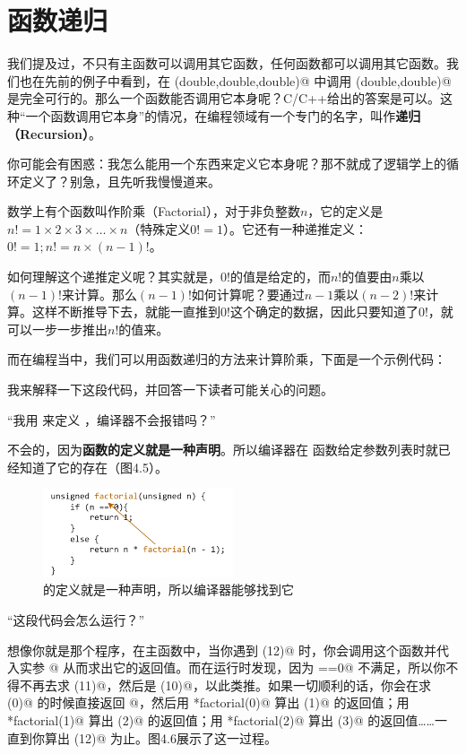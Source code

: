 \section{函数递归}
我们提及过，不只有主函数可以调用其它函数，任何函数都可以调用其它函数。我们也在先前的例子中看到，在 \lstinline@max(double,double,double)@ 中调用 \lstinline@max(double,double)@ 是完全可行的。那么一个函数能否调用它本身呢？C/C++给出的答案是可以。这种``一个函数调用它本身''的情况，在编程领域有一个专门的名字，叫作\textbf{递归（Recursion）}。\par
你可能会有困惑：我怎么能用一个东西来定义它本身呢？那不就成了逻辑学上的循环定义了？别急，且先听我慢慢道来。\par
数学上有个函数叫作阶乘（Factorial），对于非负整数$n$，它的定义是$n!=1\times2\times3\times\ldots\times n$（特殊定义$0!=1$）。它还有一种递推定义：$0!=1; n!=n\times(n-1)!$。\par
如何理解这个递推定义呢？其实就是，$0!$的值是给定的，而$n!$的值要由$n$乘以$(n-1)!$来计算。那么$(n-1)!$如何计算呢？要通过$n-1$乘以$(n-2)!$来计算。这样不断推导下去，就能一直推到$0!$这个确定的数据，因此只要知道了$0!$，就可以一步一步推出$n!$的值来。\par
而在编程当中，我们可以用函数递归的方法来计算阶乘，下面是一个示例代码：

我来解释一下这段代码，并回答一下读者可能关心的问题。\par
{\kaishu ``我用 \lstinline@factorial@ 来定义 \lstinline@factorial@，编译器不会报错吗？''}\par
不会的，因为\textbf{函数的定义就是一种声明}。所以编译器在 \lstinline@factorial@ 函数给定参数列表时就已经知道了它的存在（图4.5）。\par
\begin{figure}[htbp]
    \centering
    \includegraphics[width=0.5\textwidth]{../images/generalized_parts/04_factorial_code_logic.drawio.png}
    \caption{\lstinline@factorial@ 的定义就是一种声明，所以编译器能够找到它}
\end{figure}
{\kaishu ``这段代码会怎么运行？''}\par
想像你就是那个程序，在主函数中，当你遇到 \lstinline@factorial(12)@ 时，你会调用这个函数并代入实参 @ 从而求出它的返回值。而在运行时发现，因为 \lstinline@n==0@ 不满足，所以你不得不再去求 \lstinline@factorial(11)@，然后是 \lstinline@factorial(10)@，以此类推。如果一切顺利的话，你会在求 \lstinline@factorial(0)@ 的时候直接返回 @，然后用 *factorial(0)@ 算出 \lstinline@factorial(1)@ 的返回值；用 *factorial(1)@ 算出 \lstinline@factorial(2)@ 的返回值；用 *factorial(2)@ 算出 \lstinline@factorial(3)@ 的返回值……一直到你算出 \lstinline@factorial(12)@ 为止。图4.6展示了这一过程。\par
